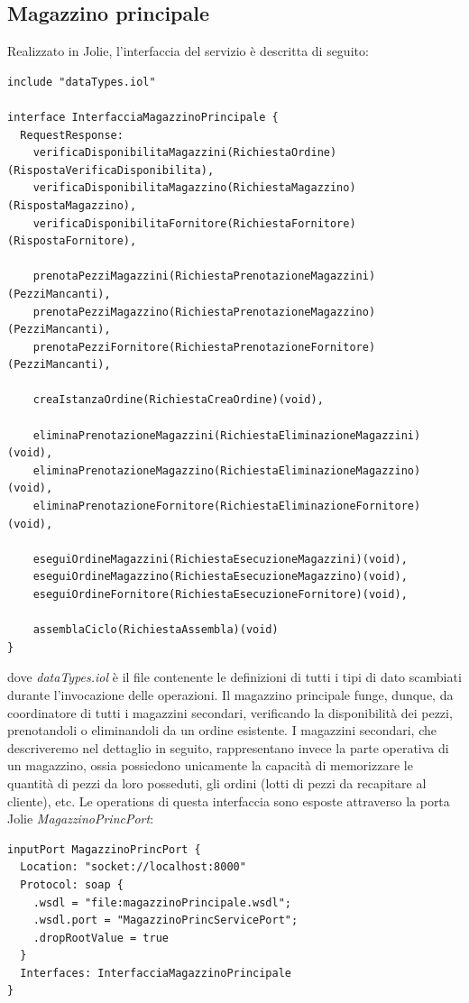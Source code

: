 \documentclass[twoside]{article}
\begin{document}
\lstset{frame=trBL}

\subsection{Magazzino principale}
Realizzato in Jolie, l'interfaccia del servizio è descritta di seguito:

\begin{lstlisting}
include "dataTypes.iol"

interface InterfacciaMagazzinoPrincipale {
  RequestResponse:
    verificaDisponibilitaMagazzini(RichiestaOrdine)(RispostaVerificaDisponibilita),
    verificaDisponibilitaMagazzino(RichiestaMagazzino)(RispostaMagazzino),
    verificaDisponibilitaFornitore(RichiestaFornitore)(RispostaFornitore),

    prenotaPezziMagazzini(RichiestaPrenotazioneMagazzini)(PezziMancanti),
    prenotaPezziMagazzino(RichiestaPrenotazioneMagazzino)(PezziMancanti),
    prenotaPezziFornitore(RichiestaPrenotazioneFornitore)(PezziMancanti),

    creaIstanzaOrdine(RichiestaCreaOrdine)(void),
  
    eliminaPrenotazioneMagazzini(RichiestaEliminazioneMagazzini)(void),
    eliminaPrenotazioneMagazzino(RichiestaEliminazioneMagazzino)(void),
    eliminaPrenotazioneFornitore(RichiestaEliminazioneFornitore)(void),

    eseguiOrdineMagazzini(RichiestaEsecuzioneMagazzini)(void),
    eseguiOrdineMagazzino(RichiestaEsecuzioneMagazzino)(void),
    eseguiOrdineFornitore(RichiestaEsecuzioneFornitore)(void),
    
    assemblaCiclo(RichiestaAssembla)(void)
}
\end{lstlisting}

dove \textit{dataTypes.iol} è il file contenente le definizioni di tutti i tipi di dato scambiati
durante l'invocazione delle operazioni. Il magazzino principale funge, dunque, da coordinatore
di tutti i magazzini secondari, verificando la disponibilità dei pezzi, prenotandoli o eliminandoli
da un ordine esistente. I magazzini secondari, che descriveremo nel dettaglio in seguito,
rappresentano invece la parte operativa di un magazzino, ossia possiedono unicamente la capacità
di memorizzare le quantità di pezzi da loro posseduti, gli ordini (lotti di pezzi da recapitare
al cliente), etc.
Le operations di questa interfaccia sono esposte attraverso
la porta Jolie \textit{MagazzinoPrincPort}:

\begin{lstlisting}
inputPort MagazzinoPrincPort {
  Location: "socket://localhost:8000"
  Protocol: soap {
    .wsdl = "file:magazzinoPrincipale.wsdl";
    .wsdl.port = "MagazzinoPrincServicePort";
    .dropRootValue = true
  }  
  Interfaces: InterfacciaMagazzinoPrincipale
}
\end{lstlisting}
\end{document}
